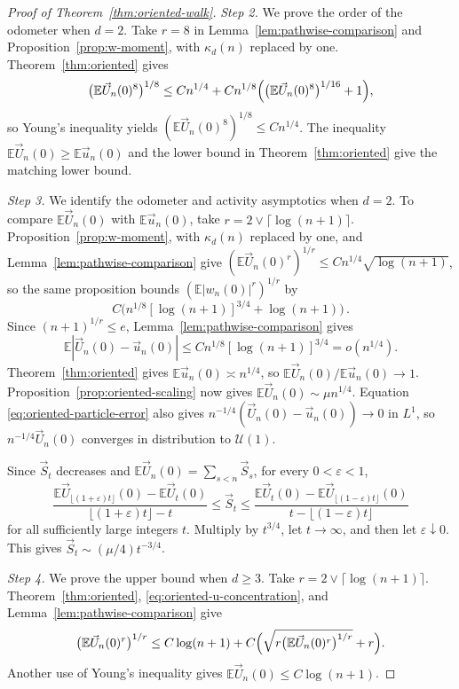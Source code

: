 \documentclass[11pt]{amsart}
\theoremstyle{plain}
\theoremstyle{definition}
\newcommand{\E}{\mathbb{E}}
\newcommand{\eps}{\varepsilon}
\begin{document}
\begin{proof}[Proof of Theorem~\ref{thm:oriented-walk}]
	\smallskip
	\noindent\emph{Step 2.} We prove the order of the odometer when $d=2$.
	Take $r=8$ in Lemma~\ref{lem:pathwise-comparison} and
	Proposition~\ref{prop:w-moment}, with $\kappa_d(n)$ replaced by one.
	Theorem~\ref{thm:oriented} gives
	\[
		\bigl(\E \vec U_n(0)^8\bigr)^{1/8}
		\leq Cn^{1/4}+Cn^{1/8}
		\Bigl(\bigl(\E \vec U_n(0)^8\bigr)^{1/16}+1\Bigr),
	\]
	so Young's inequality yields
	$(\E \vec U_n(0)^8)^{1/8}\leq Cn^{1/4}$. The inequality
	$\E \vec U_n(0)\geq\E \vec u_n(0)$ and the lower bound in
	Theorem~\ref{thm:oriented} give the matching lower bound.

	\smallskip
	\noindent\emph{Step 3.} We identify the odometer and activity asymptotics
	when $d=2$.
	To compare $\E\vec U_n(0)$ with $\E\vec u_n(0)$, take
	$r=2\vee\lceil\log(n+1)\rceil$. Proposition~\ref{prop:w-moment}, with
	$\kappa_d(n)$ replaced by one, and
	Lemma~\ref{lem:pathwise-comparison} give
	$(\E \vec U_n(0)^r)^{1/r}\leq Cn^{1/4}\sqrt{\log(n+1)}$, so the same
	proposition bounds $(\E|w_n(0)|^r)^{1/r}$ by
	\[
		C\bigl(n^{1/8}[\log(n+1)]^{3/4}+\log(n+1)\bigr)\,.
	\]
	Since $(n+1)^{1/r}\leq e$, Lemma~\ref{lem:pathwise-comparison} gives
	\begin{equation}\label{eq:oriented-particle-error}
		\E|\vec U_n(0)-\vec u_n(0)|
		\leq Cn^{1/8}[\log(n+1)]^{3/4}=o(n^{1/4}).
	\end{equation}
	Theorem~\ref{thm:oriented} gives
	$\E\vec u_n(0)\asymp n^{1/4}$, so
	$\E\vec U_n(0)/\E\vec u_n(0)\to1$. Proposition~\ref{prop:oriented-scaling}
	now gives $\E\vec U_n(0)\sim\mu n^{1/4}$. Equation
	\eqref{eq:oriented-particle-error} also gives
	$n^{-1/4}(\vec U_n(0)-\vec u_n(0))\to0$ in $L^1$, so
	$n^{-1/4}\vec U_n(0)$ converges in distribution to $\mathcal U(1)$.

	Since $\vec S_t$ decreases and
	$\E\vec U_n(0)=\sum_{s<n}\vec S_s$, for every $0<\eps<1$,
	\[
		\frac{\E\vec U_{\lfloor(1+\eps)t\rfloor}(0)-\E\vec U_t(0)}
		{\lfloor(1+\eps)t\rfloor-t}
		\leq\vec S_t\leq
		\frac{\E\vec U_t(0)-\E\vec U_{\lfloor(1-\eps)t\rfloor}(0)}
		{t-\lfloor(1-\eps)t\rfloor}
	\]
	for all sufficiently large integers $t$. Multiply by $t^{3/4}$, let
	$t\to\infty$, and then let $\eps\downarrow0$. This gives
	$\vec S_t\sim(\mu/4)t^{-3/4}$.

	\smallskip
	\noindent\emph{Step 4.} We prove the upper bound when $d\geq3$.
	Take $r=2\vee\lceil\log(n+1)\rceil$. Theorem~\ref{thm:oriented},
	\eqref{eq:oriented-u-concentration}, and
	Lemma~\ref{lem:pathwise-comparison} give
	\[
		\bigl(\E \vec U_n(0)^r\bigr)^{1/r}\leq C\log(n+1)
		+C\Bigl(\sqrt{r\bigl(\E \vec U_n(0)^r\bigr)^{1/r}}+r\Bigr).
	\]
	Another use of Young's inequality gives $\E \vec U_n(0)\leq C\log(n+1)$.


\end{proof}
\end{document}
